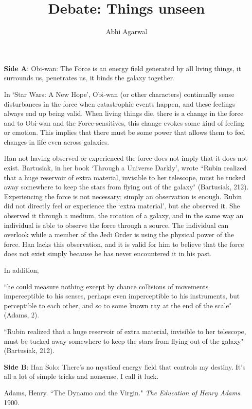 \documentclass[11pt, oneside]{article}
\title{Debate: Things unseen\vspace{-0.4cm}}
\author{Abhi Agarwal\vspace{-1cm}}
\date{}
\begin{document}
\maketitle

\noindent \textbf{Side A}: Obi-wan: The Force is an energy field generated by all living things, it surrounds us, penetrates us, it binds the galaxy together.

\par In `Star Wars: A New Hope', Obi-wan (or other characters) continually sense disturbances in the force when catastrophic events happen, and these feelings always end up being valid. When living things die, there is a change in the force and to Obi-wan and the Force-sensitives, this change evokes some kind of feeling or emotion. This implies that there must be some power that allows them to feel changes in life even across galaxies.

\par Han not having observed or experienced the force does not imply that it does not exist. Bartusiak, in her book `Through a Universe Darkly', wrote ``Rubin realized that a huge reservoir of extra material, invisible to her telescope, must be tucked away somewhere to keep the stars from flying out of the galaxy" (Bartusiak, 212). Experiencing the force is not necessary; simply an observation is enough. Rubin did not directly feel or experience the `extra material', but she observed it. She observed it through a medium, the rotation of a galaxy, and in the same way an individual is able to observe the force through a source. The individual can overlook while a member of the Jedi Order is using the physical power of the force. Han lacks this observation, and it is valid for him to believe that the force does not exist simply because he has never encountered it in his past.

\par In addition, 

\par ``he could measure nothing except by chance collisions of movements imperceptible to his senses, perhaps even imperceptible to his instruments, but perceptible to each other, and so to some known ray at the end of the scale" (Adams, 2).

\par ``Rubin realized that a huge reservoir of extra material, invisible to her telescope, must be tucked away somewhere to keep the stars from flying out of the galaxy" (Bartusiak, 212).

\noindent \textbf{Side B}: Han Solo: There's no mystical energy field that controls my destiny.  It's all a lot of simple tricks and nonsense.  I call it luck. 

\begin{workscited}
\bibent Adams, Henry.  ``The Dynamo and the Virgin."  \textit{The Education of Henry Adams}.  1900.
\end{workscited}
\end{document}
